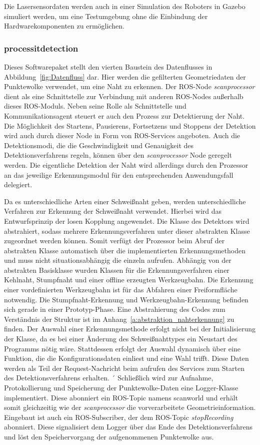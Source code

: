 Die Lasersensordaten werden auch in einer Simulation des Roboters in Gazebo simuliert werden, um eine Testumgebung ohne die Einbindung der Hardwarekomponenten zu ermöglichen.

\subsubsection{processit\textunderscore detection} \label{sssec:processit_detection}
Dieses Softwarepaket stellt den vierten Baustein des Datenflusses in Abbildung~\ref{fig:Datenfluss} dar. Hier werden die gefilterten Geometriedaten der Punktewolke verwendet, um eine Naht zu erkennen. Der ROS-Node \emph{scan\textunderscore processor} dient als eine Schnittstelle zur Verbindung mit anderen ROS-Nodes außerhalb dieses ROS-Moduls. Neben seine Rolle als Schnittstelle und Kommunikationsagent steuert er auch den Prozess zur Detektierung der Naht. Die Möglichkeit des Startens, Pausierens, Fortsetzens und Stoppens der Detektion wird auch durch dieser Node in Form von ROS-Services angeboten. Auch die Detektionsmodi, die die Geschwindigkeit und Genauigkeit des Detektionsverfahrens regeln, können über den \emph{scan\textunderscore processor} Node geregelt werden. Die eigentliche Detektion der Naht wird allerdings durch den Prozessor an das jeweilige Erkennungsmodul für den entsprechenden Anwendungsfall delegiert. 

Da es unterschiedliche Arten einer Schweißnaht geben, werden unterschiedliche Verfahren zur Erkennung der Schweißnaht verwendet. Hierbei wird das Entwurfsprinzip der losen Kopplung angewendet. Die Klasse des Detektors wird abstrahiert, sodass mehrere Erkennungsverfahren unter dieser abstrakten Klasse zugeordnet werden können. Somit verfügt der Prozessor beim Abruf der abstrakten Klasse automatisch über die implementierten Erkennungsmethoden und muss nicht situationsabhängig die einzeln aufrufen. Abhängig von der abstrakten Basisklasse wurden Klassen für die Erkennungsverfahren einer Kehlnaht, Stumpfnaht und einer offline erzeugten Werkzeugbahn. Die Erkennung einer vordefinierten Werkzeugbahn ist für das Abfahren einer Freiformfläche notwendig. Die Stumpfnaht-Erkennung und Werkzeugbahn-Erkennung befinden sich gerade in einer Prototyp-Phase. Eine Abstrahierung des Codes zum Verständnis der Struktur ist im Anhang~\ref{a:abstraktion_nahterkennung} zu finden. Der Auswahl einer Erkennungsmethode erfolgt nicht bei der Initialisierung der Klasse, da es bei einer Änderung des Schweißnahttypes ein Neustart des Programms nötig wäre. Stattdessen erfolgt der Auswahl dynamisch über eine Funktion, die die Konfigurationsdaten einliest und eine Wahl trifft. Diese Daten werden als Teil der Request-Nachricht beim aufrufen des Services zum Starten des Detektionsverfahrens erhalten.
´
Schließlich wird zur Aufnahme, Protokollierung und Speicherung der Punktewolke-Daten eine Logger-Klasse implementiert. Diese abonniert ein ROS-Topic namens scan\textunderscore world und erhält somit gleichzeitig wie der \emph{scan\textunderscore processor} die vorverarbeitete Geometrieinformation. Eingebaut ist auch ein ROS-Subscriber, der dem ROS-Topic \emph{stopRecording} abonniert. Diese signalisiert dem Logger über das Ende des Detektionsverfahrens und löst den Speichervorgang der aufgenommenen Punktewolke aus. 

